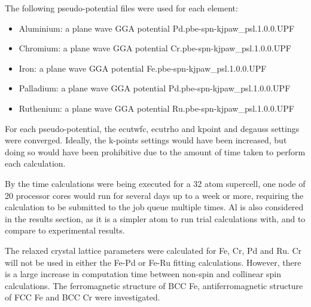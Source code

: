 \FloatBarrier 

The following pseudo-potential files were used for each element:

\begin{itemize}
\item Aluminium: a plane wave GGA potential Pd.pbe-spn-kjpaw\_psl.1.0.0.UPF
\item Chromium: a plane wave GGA potential Cr.pbe-spn-kjpaw\_psl.1.0.0.UPF
\item Iron: a plane wave GGA potential Fe.pbe-spn-kjpaw\_psl.1.0.0.UPF 
\item Palladium: a plane wave GGA potential Pd.pbe-spn-kjpaw\_psl.1.0.0.UPF
\item Ruthenium: a plane wave GGA potential Ru.pbe-spn-kjpaw\_psl.1.0.0.UPF
\end{itemize}

For each pseudo-potential, the ecutwfc, ecutrho and kpoint and degauss settings were converged.  Ideally, the k-points settings would have been increased, but doing so would have been prohibitive due to the amount of time taken to perform each calculation.

By the time calculations were being executed for a 32 atom supercell, one node of 20 processor cores would run for several days up to a week or more, requiring the calculation to be submitted to the job queue multiple times.  Al is also considered in the results section, as it is a simpler atom to run trial calculations with, and to compare to experimental results.

The relaxed crystal lattice parameters were calculated for Fe, Cr, Pd and Ru.  Cr will not be used in either the Fe-Pd or Fe-Ru fitting calculations.  However, there is a large increase in computation time between non-spin and collinear spin calculations.  The ferromagnetic structure of BCC Fe, antiferromagnetic structure of FCC Fe and BCC Cr were investigated. 

